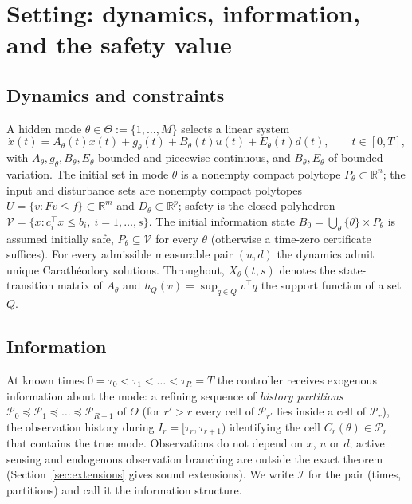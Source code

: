 \documentclass[11pt,a4paper]{article}
\theoremstyle{plain}
\theoremstyle{definition}
\theoremstyle{remark}
\newcommand{\R}{\mathbb{R}}
\newcommand{\calI}{\mathcal{I}}
\newcommand{\calP}{\mathcal{P}}
\newcommand{\calV}{\mathcal{V}}
\begin{document}
\section{Setting: dynamics, information, and the safety value}\label{sec:setting}

\subsection{Dynamics and constraints}

A hidden mode $\theta\in\Theta:=\{1,\dots,M\}$ selects a linear system
\begin{equation}\label{eq:dyn}
\dot x(t)=A_\theta(t)x(t)+g_\theta(t)+B_\theta(t)u(t)+E_\theta(t)d(t),\qquad t\in[0,T],
\end{equation}
with $A_\theta,g_\theta,B_\theta,E_\theta$ bounded and piecewise continuous, and $B_\theta,E_\theta$ of bounded variation. The initial set in mode $\theta$ is a nonempty compact polytope $P_\theta\subset\R^n$; the input and disturbance sets are nonempty compact polytopes $U=\{v:Fv\le f\}\subset\R^m$ and $D_\theta\subset\R^p$; safety is the closed polyhedron $\calV=\{x:c_i^\top x\le b_i,\ i=1,\dots,s\}$. The initial information state $B_0=\bigcup_\theta\{\theta\}\times P_\theta$ is assumed initially safe, $P_\theta\subseteq\calV$ for every $\theta$ (otherwise a time-zero certificate suffices). For every admissible measurable pair $(u,d)$ the dynamics admit unique Carath\'eodory solutions. Throughout, $X_\theta(t,s)$ denotes the state-transition matrix of $A_\theta$ and $h_Q(v)=\sup_{q\in Q}v^\top q$ the support function of a set $Q$.

\subsection{Information}

At known times $0=\tau_0<\tau_1<\dots<\tau_R=T$ the controller receives exogenous information about the mode: a refining sequence of \emph{history partitions} $\calP_0\preceq\calP_1\preceq\dots\preceq\calP_{R-1}$ of $\Theta$ (for $r'>r$ every cell of $\calP_{r'}$ lies inside a cell of $\calP_r$), the observation history during $I_r=[\tau_r,\tau_{r+1})$ identifying the cell $C_r(\theta)\in\calP_r$ that contains the true mode. Observations do not depend on $x$, $u$ or $d$; active sensing and endogenous observation branching are outside the exact theorem (Section~\ref{sec:extensions} gives sound extensions). We write $\calI$ for the pair (times, partitions) and call it the information structure.
\end{document}
